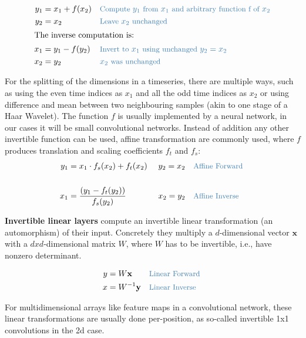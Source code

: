 \begin{align*}
    y_1 &= x_1 + f(x_2) && \codecomment{\text{Compute } y_1 \text{ from } x_1 \text{ and arbitrary function f of } x_2} \\
    y_2 &= x_2 && \codecomment{\text{Leave } x_2 \text{ unchanged}} \\
\intertext{The inverse computation is:}
    x_1 &= y_1 - f(y_2) && \codecomment{\text{Invert to } x_1 \text{ using unchanged } y_2=x_2} \\
    x_2 &= y_2 &&  \codecomment{x_2 \text{ was unchanged}}\\
\end{align*}

% 

For the splitting of the dimensions in a timeseries, there are multiple
ways, such as using the even time indices as $x_1$ and all the odd
time indices as $x_2$ or using difference and mean between two
neighbouring samples (akin to one stage of a Haar Wavelet). The function
$f$ is usually implemented by a neural network, in our cases it will
be small convolutional networks. Instead of addition any other
invertible function can be used, affine transformation are commonly
used, where $f$ produces translation and scaling coefficients $f_t$
and $f_s$:
\begin{align*}
    y_1 &= x_1 \cdot f_s(x_2) + f_t(x_2) && \text{ } y_2=x_2 && \codecomment{\text{Affine Forward }} \\
    \\
    x_1 &= \frac{(y_1  - f_t(y_2))}{f_s(y_2)} && \text{ } x_2=y_2 && \codecomment{\text{Affine Inverse}} \\
\end{align*}

\textbf{Invertible linear layers} compute an invertible linear
transformation (an automorphism) of their input. Concretely they
multiply a $d$-dimensional vector $\mathbf{x}$ with a
$dxd$-dimensional matrix $W$, where $W$ has to be invertible,
i.e., have nonzero determinant.

\begin{align*}
    y&=W \mathbf{x} && \codecomment{\text{Linear Forward }} \\
    x&=W^{-1} \mathbf{y} && \codecomment{\text{Linear Inverse}} \\
\end{align*}

For multidimensional arrays like feature maps in a convolutional
network, these linear transformations are usually done per-position, as
so-called invertible 1x1 convolutions in the 2d case.


